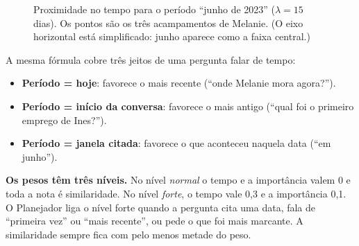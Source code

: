 \documentclass[11pt]{article}
\newcommand{\prox}{\operatorname{prox}}
\begin{document}
\begin{figure}[H]
\centering
{}
\caption{Proximidade no tempo para o período ``junho de 2023'' ($\lambda=15$
dias). Os pontos são os três acampamentos de Melanie. (O eixo horizontal está
simplificado: junho aparece como a faixa central.)}
\label{fig:prox}
\end{figure}

A mesma fórmula cobre três jeitos de uma pergunta falar de tempo:
\begin{itemize}
\item \textbf{Período = hoje}: favorece o mais recente (``onde Melanie mora
  agora?'').
\item \textbf{Período = início da conversa}: favorece o mais antigo (``qual
  foi o primeiro emprego de Ines?'').
\item \textbf{Período = janela citada}: favorece o que aconteceu naquela data
  (``em junho'').
\end{itemize}

\textbf{Os pesos têm três níveis.} No nível \emph{normal} o tempo e a
importância valem 0 e toda a nota é similaridade. No nível \emph{forte}, o
tempo vale 0,3 e a importância 0,1. O Planejador liga o nível forte quando a
pergunta cita uma data, fala de ``primeira vez'' ou ``mais recente'', ou pede
o que foi mais marcante. A similaridade sempre fica com pelo menos metade do
peso.
\end{document}
